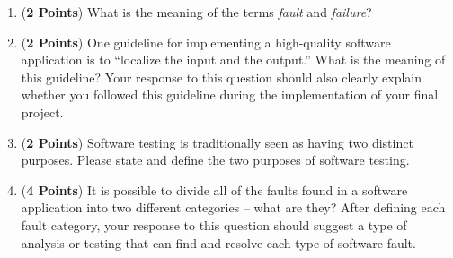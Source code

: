 \documentclass[12pt,epsf,psfig,graphics]{article}
\newtheorem{define}{Definition}
\begin{document}
\begin{enumerate}
\begin{enumerate}

  \item ({\bf 2 Points}) What is the meaning of the terms {\em fault}
    and {\em failure}?

  \item ({\bf 2 Points}) One guideline for implementing a high-quality
    software application is to ``localize the input and the output.''
    What is the meaning of this guideline?  Your response to this
    question should also clearly explain whether you followed this
    guideline during the implementation of your final project.

  \item ({\bf 2 Points}) Software testing is traditionally seen as
    having two distinct purposes.  Please state and define the two
    purposes of software testing.

  \item ({\bf 4 Points}) It is possible to divide all of the faults
    found in a software application into two different categories --
    what are they?  After defining each fault category, your response
    to this question should suggest a type of analysis or testing that
    can find and resolve each type of software fault.

\end{enumerate}








\end{enumerate}
\end{document}
